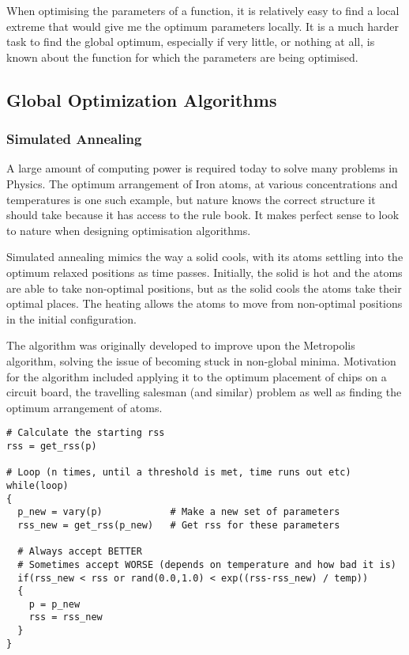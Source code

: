 When optimising the parameters of a function, it is relatively easy to find a local extreme that would give me the optimum parameters locally.  It is a much harder task to find the global optimum, especially if very little, or nothing at all, is known about the function for which the parameters are being optimised.



\subsection{Global Optimization Algorithms}


\subsubsection{Simulated Annealing}
\label{section:optsimulatedannealing}

A large amount of computing power is required today to solve many problems in Physics.  The optimum arrangement of Iron atoms, at various concentrations and temperatures is one such example, but nature knows the correct structure it should take because it has access to the rule book.  It makes perfect sense to look to nature when designing optimisation algorithms.

Simulated annealing mimics the way a solid cools, with its atoms settling into the optimum relaxed positions as time passes.  Initially, the solid is hot and the atoms are able to take non-optimal positions, but as the solid cools the atoms take their optimal places.  The heating allows the atoms to move from non-optimal positions in the initial configuration.

The algorithm was originally developed to improve upon the Metropolis algorithm, solving the issue of becoming stuck in non-global minima.  Motivation for the algorithm included applying it to the optimum placement of chips on a circuit board\cite{simanneal}, the travelling salesman (and similar) problem as well as finding the optimum arrangement of atoms.


\begin{lstlisting}[style=sPseudo,caption={Pseudocode for the simulated annealing algorithm},label={listing:simulatedannealing}]
# Calculate the starting rss
rss = get_rss(p)

# Loop (n times, until a threshold is met, time runs out etc)
while(loop)
{  
  p_new = vary(p)            # Make a new set of parameters
  rss_new = get_rss(p_new)   # Get rss for these parameters

  # Always accept BETTER
  # Sometimes accept WORSE (depends on temperature and how bad it is)
  if(rss_new < rss or rand(0.0,1.0) < exp((rss-rss_new) / temp))
  {
    p = p_new
    rss = rss_new
  }
}    
\end{lstlisting}


